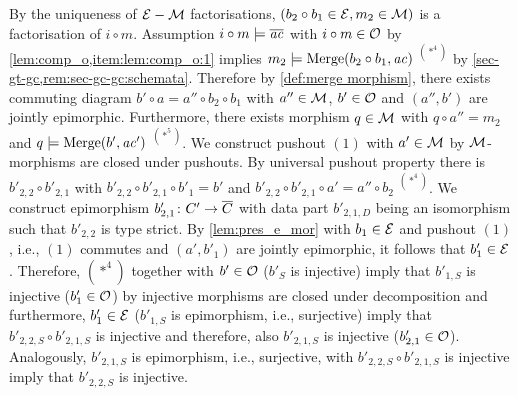 \begin{description}
\begin{description}
By the uniqueness of $\mathcal{E}-{\cal M}$ factorisations, $(b_2 \circ b_1 \in \mathcal{E},m_2 \in {\cal M})$ is a factorisation of $i \circ m$.
Assumption $i \circ m \models \overline{\mathit{ac}}$ with $i \circ m \in {\cal O}$ by \cref{lem:comp_o,item:lem:comp_o:1} implies $m_2 \models \mathrm{Merge}(b_2 \circ b_1,\mathit{ac})$ $^{(*^4)}$ by \cref{sec-gt-gc,rem:sec-gc-gc:schemata}.
Therefore by \cref{def:merge morphism}, there exists commuting diagram $b' \circ a=a'' \circ b_2 \circ b_1$ with $a'' \in {\cal M}$, $b' \in {\cal O}$ and $(a'',b')$ are jointly epimorphic.
Furthermore, there exists morphism $q \in {\cal M}$ with $q \circ a''=m_2$ and $q \models \mathrm{Merge}(b',\mathit{ac}')$ $^{(*^5)}$.
We construct pushout $(1)$ with $a' \in {\cal M}$ by ${\cal M}$-morphisms are closed under pushouts.
By universal pushout property there is $b'_{2,2} \circ b'_{2,1}$ with $b'_{2,2} \circ b'_{2,1} \circ b'_1=b'$ and $b'_{2,2} \circ b'_{2,1} \circ a'=a'' \circ b_2$ $^{(*^4)}$.
We construct epimorphism $b'_{2,1}\colon C' \to \overline{C}$ with data part $b'_{2,1,D}$ being an isomorphism such that $b'_{2,2}$ is type strict.
By \cref{lem:pres_e_mor} with $b_1 \in \mathcal{E}$ and pushout $(1)$, i.e., $(1)$ commutes and $(a',b'_1)$ are jointly epimorphic, it follows that $b'_1 \in \mathcal{E}$.
Therefore, $(*^4)$ together with $b' \in {\cal O}$ ($b'_S$ is injective) imply that $b'_{1,S}$ is injective ($b'_1 \in {\cal O}$) by injective morphisms are closed under decomposition and furthermore, $b'_1 \in \mathcal{E}$ ($b'_{1,S}$ is epimorphism, i.e., surjective) imply that $b'_{2,2,S} \circ b'_{2,1,S}$ is injective and therefore, also $b'_{2,1,S}$ is injective ($b'_{2,1} \in {\cal O}$).
Analogously, $b'_{2,1,S}$ is epimorphism, i.e., surjective, with $b'_{2,2,S} \circ b'_{2,1,S}$ is injective imply that $b'_{2,2,S}$ is injective.
\begin{center}
\end{center}
\end{description}
\end{description}
